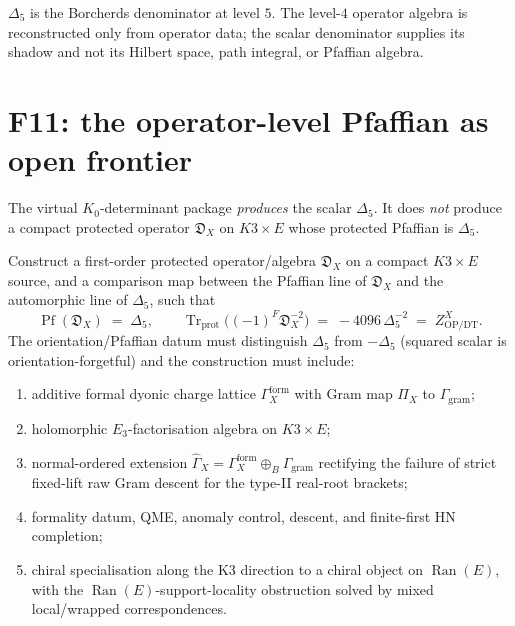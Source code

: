 \documentclass[11pt]{memoir}
\providecommand{\Tr}{\operatorname{Tr}}
\providecommand{\Pf}{\operatorname{Pf}}
\begin{document}
\begin{corollary}
\label{cor:scalar-shadow-operator-algebra}
$\Delta_5$ is the Borcherds denominator at level $5$. The level-$4$
operator algebra is reconstructed only from operator data; the
scalar denominator supplies its shadow and not its Hilbert space,
path integral, or Pfaffian algebra.
\end{corollary}

\section{F11: the operator-level Pfaffian as open frontier}
\label{sec:vd-f11}

The virtual $K_0$-determinant package \emph{produces} the scalar
$\Delta_5$. It does \emph{not} produce a compact protected operator
$\mathfrak D_X$ on $K3 \times E$ whose protected Pfaffian is
$\Delta_5$.

\begin{problem}
\label{prob:F11}
Construct a first-order protected operator/algebra $\mathfrak D_X$ on
a compact $K3 \times E$ source, and a comparison map between the
Pfaffian line of $\mathfrak D_X$ and the automorphic line of
$\Delta_5$, such that
\[
  \Pf(\mathfrak D_X) \;=\; \Delta_5,
  \qquad
  \Tr_{\mathrm{prot}}\bigl((-1)^F \mathfrak D_X^{-2}\bigr)
  \;=\; -4096\,\Delta_5^{-2} \;=\; Z^X_{\mathrm{OP/DT}}.
\]
The orientation/Pfaffian datum must distinguish $\Delta_5$ from
$-\Delta_5$ (squared scalar is orientation-forgetful) and the
construction must include:
\begin{enumerate}
\item additive formal dyonic charge lattice $\Gamma_X^{\mathrm{form}}$
  with Gram map $\Pi_X$ to $\Gamma_{\mathrm{gram}}$;
\item holomorphic $E_3$-factorisation algebra on $K3 \times E$;
\item normal-ordered extension $\widehat\Gamma_X = \Gamma_X^{\mathrm{form}}
  \oplus_B \Gamma_{\mathrm{gram}}$ rectifying the failure of strict
  fixed-lift raw Gram descent for the type-II real-root brackets;
\item formality datum, QME, anomaly control, descent, and finite-first
  HN completion;
\item chiral specialisation along the K3 direction to a chiral object
  on $\operatorname{Ran}(E)$, with the
  $\operatorname{Ran}(E)$-support-locality obstruction solved by mixed
  local/wrapped correspondences.
\end{enumerate}
\end{problem}
\end{document}
